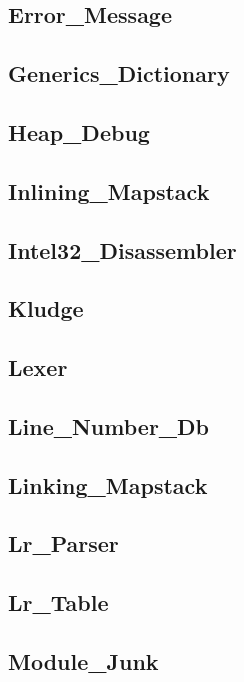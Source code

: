 \subsection{Error\_Message}				
\subsection{Generics\_Dictionary}			
\subsection{Heap\_Debug}				
\subsection{Inlining\_Mapstack}				
\subsection{Intel32\_Disassembler}			
\subsection{Kludge}					
\subsection{Lexer}					
\subsection{Line\_Number\_Db}				
\subsection{Linking\_Mapstack}				
\subsection{Lr\_Parser}					
\subsection{Lr\_Table}					
\subsection{Module\_Junk}				
